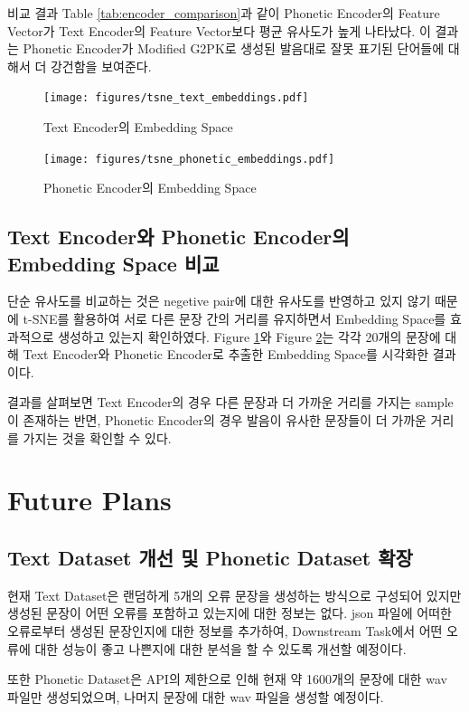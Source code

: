 \documentclass[letterpaper]{article} %
\begin{document}
비교 결과 Table \ref{tab:encoder_comparison}과 같이 Phonetic Encoder의 Feature Vector가 Text Encoder의 Feature Vector보다 평균 유사도가 높게 나타났다. 이 결과는 Phonetic Encoder가 Modified G2PK로 생성된 발음대로 잘못 표기된 단어들에 대해서 더 강건함을 보여준다.

\begin{figure}[ht]
    \centering
    \texttt{[image: figures/tsne\_text\_embeddings.pdf]}
    \caption{Text Encoder의 Embedding Space}
    \label{fig:tsne_text_encoder}
\end{figure}

\begin{figure}[ht]
    \centering
    \texttt{[image: figures/tsne\_phonetic\_embeddings.pdf]}
    \caption{Phonetic Encoder의 Embedding Space}
    \label{fig:tsne_phonetic_encoder}
\end{figure}

\subsection{Text Encoder와 Phonetic Encoder의 Embedding Space 비교}
단순 유사도를 비교하는 것은 negetive pair에 대한 유사도를 반영하고 있지 않기 때문에 t-SNE를 활용하여 서로 다른 문장 간의 거리를 유지하면서 Embedding Space를 효과적으로 생성하고 있는지 확인하였다. 
Figure \ref{fig:tsne_text_encoder}와 Figure \ref{fig:tsne_phonetic_encoder}는 각각 20개의 문장에 대해 Text Encoder와 Phonetic Encoder로 추출한 Embedding Space를 시각화한 결과이다.

결과를 살펴보면 Text Encoder의 경우 다른 문장과 더 가까운 거리를 가지는 sample이 존재하는 반면, Phonetic Encoder의 경우 발음이 유사한 문장들이 더 가까운 거리를 가지는 것을 확인할 수 있다.

\section{Future Plans}
\subsection{Text Dataset 개선 및 Phonetic Dataset 확장}
현재 Text Dataset은 랜덤하게 5개의 오류 문장을 생성하는 방식으로 구성되어 있지만 생성된 문장이 어떤 오류를 포함하고 있는지에 대한 정보는 없다. 
json 파일에 어떠한 오류로부터 생성된 문장인지에 대한 정보를 추가하여, Downstream Task에서 어떤 오류에 대한 성능이 좋고 나쁜지에 대한 분석을 할 수 있도록 개선할 예정이다.

또한 Phonetic Dataset은 API의 제한으로 인해 현재 약 1600개의 문장에 대한 wav 파일만 생성되었으며, 나머지 문장에 대한 wav 파일을 생성할 예정이다.
\end{document}
